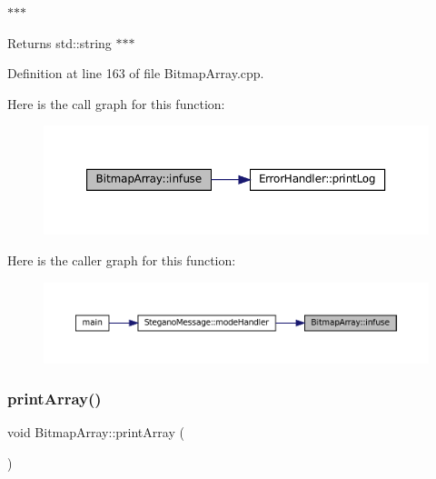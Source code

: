 $\ast$$\ast$$\ast$ 

\begin{DoxyReturn}{Returns}
std\+::string $\ast$$\ast$$\ast$ 
\end{DoxyReturn}


Definition at line 163 of file Bitmap\+Array.\+cpp.

Here is the call graph for this function\+:\nopagebreak
\begin{figure}[H]
\begin{center}
\leavevmode
\includegraphics[width=350pt]{classBitmapArray_afb549703b79c26499fc443f187bb3d6a_cgraph}
\end{center}
\end{figure}
Here is the caller graph for this function\+:\nopagebreak
\begin{figure}[H]
\begin{center}
\leavevmode
\includegraphics[width=350pt]{classBitmapArray_afb549703b79c26499fc443f187bb3d6a_icgraph}
\end{center}
\end{figure}
\mbox{\label{classBitmapArray_a0580ddeedca7f59fd8d43ec92e6bb4a1}} 
\subsubsection{\texorpdfstring{printArray()}{printArray()}\hspace{0.1cm}{\footnotesize\ttfamily [1/2]}}
{\footnotesize\ttfamily void Bitmap\+Array\+::print\+Array (\begin{DoxyParamCaption}{ }\end{DoxyParamCaption})}



